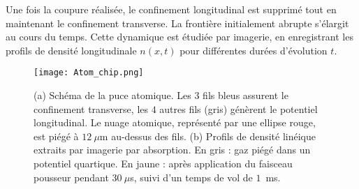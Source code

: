 Une fois la coupure réalisée, le confinement longitudinal est supprimé tout en maintenant le confinement transverse. La frontière initialement abrupte s’élargit au cours du temps. Cette dynamique est étudiée par imagerie, en enregistrant les profils de densité longitudinale $n(x,t)$ pour différentes durées d’évolution $t$.

\begin{figure}[!htb]
\centering
\texttt{[image: Atom\_chip.png]}
\caption{(a) Schéma de la puce atomique. Les $3$ fils bleus assurent le confinement transverse, les $4$ autres fils (gris) génèrent le potentiel longitudinal. Le nuage atomique, représenté par une ellipse rouge, est piégé à $12~\mu$m au-dessus des fils. (b) Profils de densité linéique extraits par imagerie par absorption. En gris : gaz piégé dans un potentiel quartique. En jaune : après application du faisceau pousseur pendant $30~\mu$s, suivi d’un temps de vol de $1$~ms.}
\label{fig:setup}
\end{figure}
